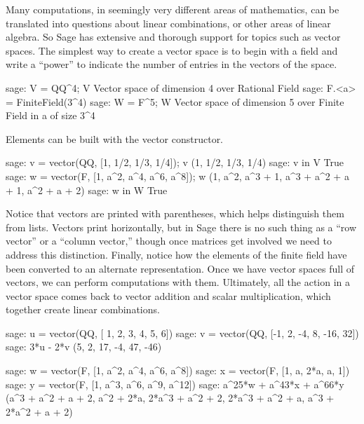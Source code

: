 Many computations, in seemingly very different areas of mathematics, can be translated into questions about linear combinations, or other areas of linear algebra.  So Sage has extensive and thorough support for topics such as vector spaces.
%
%
The simplest way to create a vector space is to begin with a field and write a ``power'' to indicate the number of entries in the vectors of the space.
%
\begin{sageexample}
sage: V = QQ^4; V
Vector space of dimension 4 over Rational Field
sage: F.<a> = FiniteField(3^4)
sage: W = F^5; W
Vector space of dimension 5 over Finite Field in a of size 3^4                                                                                                            \end{sageexample}
%
Elements can be built with the vector constructor.
%
\begin{sageexample}
sage: v = vector(QQ, [1, 1/2, 1/3, 1/4]); v
(1, 1/2, 1/3, 1/4)
sage: v in V
True
sage: w = vector(F, [1, a^2, a^4, a^6, a^8]); w
(1, a^2, a^3 + 1, a^3 + a^2 + a + 1, a^2 + a + 2)
sage: w in W
True
\end{sageexample}
%
Notice that vectors are printed with parentheses, which helps distinguish them from lists.  Vectors print horizontally, but in Sage there is no such thing as a ``row vector'' or a ``column vector,'' though once matrices get involved we need to address this distinction.  Finally, notice how the elements of the finite field have been converted to an alternate representation.
%
Once we have vector spaces full of vectors, we can perform computations with them.  Ultimately, all the action in a vector space comes back to vector addition and scalar multiplication, which together create linear combinations.
%
\begin{sageexample}
sage: u = vector(QQ, [ 1, 2,  3, 4,   5,  6])
sage: v = vector(QQ, [-1, 2, -4, 8, -16, 32])
sage: 3*u - 2*v
(5, 2, 17, -4, 47, -46)                                                                                                                                                   \end{sageexample}
%
\begin{sageexample}
sage: w = vector(F, [1, a^2, a^4, a^6,  a^8])
sage: x = vector(F, [1,   a, 2*a,   a,    1])
sage: y = vector(F, [1, a^3, a^6, a^9, a^12])
sage: a^25*w + a^43*x + a^66*y
(a^3 + a^2 + a + 2, a^2 + 2*a, 2*a^3 + a^2 + 2, 2*a^3 + a^2 + a,
 a^3 + 2*a^2 + a + 2)
\end{sageexample}
%

